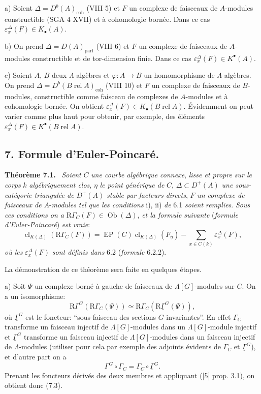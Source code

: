 \documentclass[11pt]{article}
\newenvironment{statement}[1]{\par\medskip\noindent\textbf{#1.}\ }{\par\medskip}
\providecommand{\EP}{\operatorname{EP}}
\providecommand{\parf}{\mathrm{parf}}
\providecommand{\coh}{\mathrm{coh}}
\providecommand{\EP}{\operatorname{EP}}
\providecommand{\parf}{\mathrm{parf}}
\providecommand{\coh}{\mathrm{coh}}
\providecommand{\clK}[1]{\operatorname{cl}_{K(#1)}}
\begin{document}
a) Soient $\Delta=D^b(A)_{\coh}$ (VIII 5) et $F$ un complexe de faisceaux de $A$-modules constructible (SGA 4 XVII) et à cohomologie bornée. Dans ce cas $\varepsilon_x^\Delta(F)\in K_\bullet(A)$.

b) On prend $\Delta=D(A)_{\parf}$ (VIII 6) et $F$ un complexe de faisceaux de $A$-modules constructible et de tor-dimension finie. Dans ce cas $\varepsilon_x^\Delta(F)\in K^{\bullet}(A)$.

c) Soient $A$, $B$ deux $\Lambda$-algèbres et $\varphi:A\to B$ un homomorphisme de $\Lambda$-algèbres. On prend $\Delta=D^b(B\operatorname{ rel }A)_{\coh}$ (VIII 10) et $F$ un complexe de faisceaux de $B$-modules, constructible comme faisceau de complexes de $A$-modules et à cohomologie bornée. On obtient $\varepsilon_x^\Delta(F)\in K_\bullet(B\operatorname{ rel }A)$. Évidemment on peut varier comme plus haut pour obtenir, par exemple, des éléments $\varepsilon_x^\Delta(F)\in K^{\bullet}(B\operatorname{ rel }A)$.

\subsection*{7. Formule d'Euler-Poincaré.}

\begin{statement}{Théorème 7.1}
\emph{Soient} $C$ \emph{une courbe algébrique connexe}, \emph{lisse et propre sur le corps} $k$ \emph{algébriquement clos}, $\eta$ \emph{le point générique de} $C$, $\Delta\subset D^+(A)$ \emph{une sous-catégorie triangulée de} $D^+(A)$ \emph{stable par facteurs directs}, $F$ \emph{un complexe de faisceaux de} $A$-\emph{modules tel que les conditions} i), ii) \emph{de} 6.1 \emph{soient remplies}. \emph{Sous ces conditions on a} $\mathrm{R}\Gamma_C(F)\in\operatorname{Ob}(\Delta)$, \emph{et la formule suivante} (\emph{formule d'Euler-Poincaré}) \emph{est vraie}:
\[
\clK{\Delta}(\mathrm{R}\Gamma_C(F))
=
\EP(C)\clK{\Delta}(F_{\bar\eta})
-\sum_{x\in C(k)}\varepsilon_x^\Delta(F),
\tag{7.2}
\]
\emph{où les} $\varepsilon_x^\Delta(F)$ \emph{sont définis dans} 6.2 (\emph{formule} 6.2.2).
\end{statement}

La
démonstration de ce théorème sera faite en quelques étapes.

a) Soit $\Psi$ un complexe borné à gauche de faisceaux de $\Lambda[G]$-modules sur $C$. On a un isomorphisme:
\[
\mathrm{R}\Gamma^G(\mathrm{R}\Gamma_C(\Psi))\simeq\mathrm{R}\Gamma_C(\mathrm{R}\underline{\Gamma}^G(\Psi)),
\tag{7.3}
\]
où $\underline{\Gamma}^G$ est le foncteur: ``sous-faisceau des sections $G$-invariantes''. En effet $\Gamma_C$ transforme un faisceau injectif de $\Lambda[G]$-modules dans un $\Lambda[G]$-module injectif et $\underline{\Gamma}^G$ transforme un faisceau injectif de $\Lambda[G]$-modules dans un faisceau injectif de $\Lambda$-modules (utiliser pour cela par exemple des adjoints évidents de $\Gamma_C$ et $\underline{\Gamma}^G$), et d'autre part on a
\[
\Gamma^G\circ\Gamma_C=\Gamma_C\circ\underline{\Gamma}^G.
\]
Prenant les foncteurs dérivés des deux membres et appliquant ([5] prop. 3.1), on obtient donc (7.3).
\end{document}
